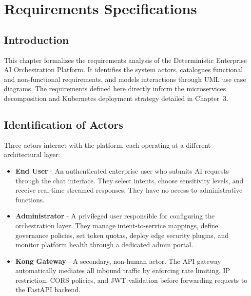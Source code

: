 \chapter{Requirements Specifications}

\section*{Introduction}

This chapter formalizes the requirements analysis of the Deterministic Enterprise AI Orchestration Platform. It identifies the system actors, catalogues functional and non-functional requirements, and models interactions through UML use case diagrams. The requirements defined here directly inform the microservices decomposition and Kubernetes deployment strategy detailed in Chapter~3.


\section{Identification of Actors}

Three actors interact with the platform, each operating at a different architectural layer:

\begin{itemize}
    \item \textbf{End User} - An authenticated enterprise user who submits AI requests through the chat interface. They select intents, choose sensitivity levels, and receive real-time streamed responses. They have no access to administrative functions.

    \item \textbf{Administrator} - A privileged user responsible for configuring the orchestration layer. They manage intent-to-service mappings, define governance policies, set token quotas, deploy edge security plugins, and monitor platform health through a dedicated admin portal.

    \item \textbf{Kong Gateway} - A secondary, non-human actor. The API gateway automatically mediates all inbound traffic by enforcing rate limiting, IP restriction, CORS policies, and JWT validation before forwarding requests to the FastAPI backend.
\end{itemize}


